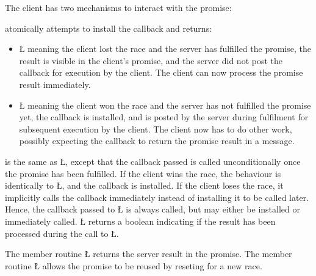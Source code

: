 \documentclass[openright,twoside]{report}
\begin{document}
The client has two mechanisms to interact with the promise:
\begin{description}[leftmargin=3pt,topsep=5pt,parsep=0pt]
\item[\LGinlinetrue\LGbegin\lgrinde\L{\LB{\V{maybe}}}\endlgrinde\LGend{}] 
atomically attempts to install the callback and returns:
\begin{itemize}
\item
\LGinlinetrue\LGbegin\lgrinde\L{}\endlgrinde\LGend{} meaning the client lost the race and the server has fulfilled the promise, the result is visible in the client's promise, and the server did not post the callback for execution by the client.
The client can now process the promise result immediately.
\item
\LGinlinetrue\LGbegin\lgrinde\L{}\endlgrinde\LGend{} meaning the client won the race and the server has not fulfilled the promise yet, the callback is installed, and is posted by the server during fulfilment for subsequent execution by the client.
The client now has to do other work, possibly expecting the callback to return the promise result in a message.
\end{itemize}
\item[\LGinlinetrue\LGbegin\lgrinde\L{\LB{\V{then}}}\endlgrinde\LGend{}]
is the same as \LGinlinetrue\LGbegin\lgrinde\L{}\endlgrinde\LGend{}, except that the callback passed is called unconditionally once the promise has been fulfilled.
If the client wins the race, the behaviour is identically to \LGinlinetrue\LGbegin\lgrinde\L{}\endlgrinde\LGend{}, and the callback is installed.
If the client loses the race, it implicitly calls the callback immediately instead of installing it to be called later.
Hence, the callback passed to \LGinlinetrue\LGbegin\lgrinde\L{}\endlgrinde\LGend{} is always called, but may either be installed or immediately called.
\LGinlinetrue\LGbegin\lgrinde\L{}\endlgrinde\LGend{} returns a boolean indicating if the result has been processed during the call to \LGinlinetrue\LGbegin\lgrinde\L{}\endlgrinde\LGend{}.
\end{description}
The member routine \LGinlinetrue\LGbegin\lgrinde\L{}\endlgrinde\LGend{} returns the server result in the promise.
The member routine \LGinlinetrue\LGbegin\lgrinde\L{}\endlgrinde\LGend{} allows the promise to be reused by reseting for a new race.
\end{document}
